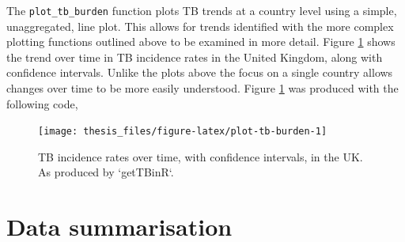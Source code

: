 \documentclass[11pt,twoside]{bristolthesis}
\begin{document}
  The \texttt{plot\_tb\_burden} function plots TB trends at a country level using a simple, unaggregated, line plot. This allows for trends identified with the more complex plotting functions outlined above to be examined in more detail. Figure \ref{fig:plot-tb-burden} shows the trend over time in TB incidence rates in the United Kingdom, along with confidence intervals. Unlike the plots above the focus on a single country allows changes over time to be more easily understood. Figure \ref{fig:plot-tb-burden} was produced with the following code,
  \begin{Shaded}
  \begin{Highlighting}[]
  \NormalTok{(} \NormalTok{,}
                  \NormalTok{,}
                  \NormalTok{) }
  \end{Highlighting}
  \end{Shaded}
  \begin{figure}
  
  {\centering \texttt{[image: thesis\_files/figure-latex/plot-tb-burden-1]} 
  
  }
  
  \caption{TB incidence rates over time, with confidence intervals, in the UK. As produced by `getTBinR`.}\label{fig:plot-tb-burden}
  \end{figure}
  \hypertarget{gettbinr-sum}{%
  \section{Data summarisation}\label{gettbinr-sum}}
  
\end{document}
